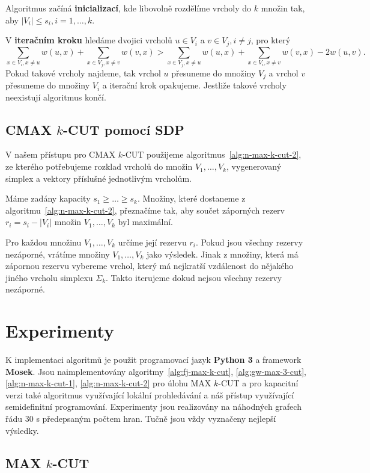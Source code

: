 Algoritmus začíná \textbf{inicializací}, kde libovolně rozdělíme vrcholy do $k$ množin tak, aby $|V_i| \leq s_i, i = 1, \dots, k$.

V \textbf{iteračním kroku} hledáme dvojici vrcholů $u \in V_i$ a $v \in V_j, i \neq j$, pro který
$$
    \sum_{x \in V_i, x \neq u} w(u,x) + \sum_{x \in V_j, x \neq v} w(v,x) > 
    \sum_{x \in V_j, x \neq u} w(u,x) + \sum_{x \in V_i, x \neq v} w(v,x) - 2 w(u,v).
$$
Pokud takové vrcholy najdeme, tak vrchol $u$ přesuneme do množiny $V_j$ a vrchol $v$ přesuneme do množiny $V_i$ a iterační krok opakujeme. Jestliže takové vrcholy neexistují algoritmus končí.

\subsection{CMAX $k$-CUT pomocí SDP}

V našem přístupu pro CMAX $k$-CUT použijeme algoritmus~\ref{alg:n-max-k-cut-2}, ze kterého potřebujeme rozklad vrcholů do množin $V_1, \dots, V_k$, vygenerovaný simplex a vektory příslušné jednotlivým vrcholům.

Máme zadány kapacity $s_1 \geq \dots \geq s_k$. Množiny, které dostaneme z algoritmu~\ref{alg:n-max-k-cut-2}, přeznačíme tak, aby součet záporných rezerv $r_i = s_i - |V_i|$ množin $V_1, \dots, V_k$ byl maximální.

Pro každou množinu $V_1, \dots, V_k$ určíme její rezervu $r_i$. Pokud jsou všechny rezervy nezáporné, vrátíme množiny $V_1, \dots, V_k$ jako výsledek. Jinak z množiny, která má zápornou rezervu vybereme vrchol, který má nejkratší vzdálenost do nějakého jiného vrcholu simplexu $\Sigma_k$. Takto iterujeme dokud nejsou všechny rezervy nezáporné.

\section{Experimenty}

K implementaci algoritmů je použit programovací jazyk \textbf{Python 3} a framework \textbf{Mosek}. Jsou naimplementovány algoritmy~\ref{alg:fj-max-k-cut}, \ref{alg:gw-max-3-cut}, \ref{alg:n-max-k-cut-1}, \ref{alg:n-max-k-cut-2} pro úlohu MAX $k$-CUT a pro kapacitní verzi také algoritmus využívající lokální prohledávání a náš přístup využívající semidefinitní programování. Experimenty jsou realizovány na náhodných grafech řádu $30$ s předepsaným počtem hran. Tučně jsou vždy vyznačeny nejlepší výsledky.


\subsection{MAX $k$-CUT}

